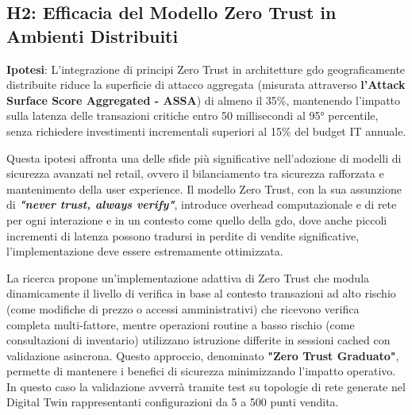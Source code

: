 \subsection{H2: Efficacia del Modello Zero Trust in Ambienti Distribuiti}

\label{ssec:h2}
\textbf{Ipotesi}: L'integrazione di principi Zero Trust in architetture \gls{gdo} geograficamente distribuite riduce la superficie di attacco aggregata (misurata attraverso \textbf{l'Attack Surface Score Aggregated - ASSA}) di almeno il 35\%, mantenendo l'impatto sulla latenza delle transazioni critiche entro 50 millisecondi al 95° percentile, senza richiedere investimenti incrementali superiori al 15\% del budget IT annuale.

Questa ipotesi affronta una delle sfide più significative nell'adozione di modelli di sicurezza avanzati nel retail, ovvero il bilanciamento tra sicurezza rafforzata e mantenimento della user experience. Il modello Zero Trust, con la sua assunzione di \textit{\textbf{"never trust, always verify"}}, introduce overhead computazionale e di rete per ogni interazione e in un contesto come quello della \gls{gdo}, dove anche piccoli incrementi di latenza possono tradursi in perdite di vendite significative, l'implementazione deve essere estremamente ottimizzata.

La ricerca propone un'implementazione adattiva di Zero Trust che modula dinamicamente il livello di verifica in base al contesto transazioni ad alto rischio (come modifiche di prezzo o accessi amministrativi) che ricevono verifica completa multi-fattore, mentre operazioni routine a basso rischio (come consultazioni di inventario) utilizzano istruzione differite in sessioni cached con validazione asincrona. Questo approccio, denominato \textbf{"Zero Trust Graduato"}, permette di mantenere i benefici di sicurezza minimizzando l'impatto operativo.
In questo caso la validazione avverrà tramite test su topologie di rete generate nel Digital Twin 
rappresentanti configurazioni da 5 a 500 punti vendita.

